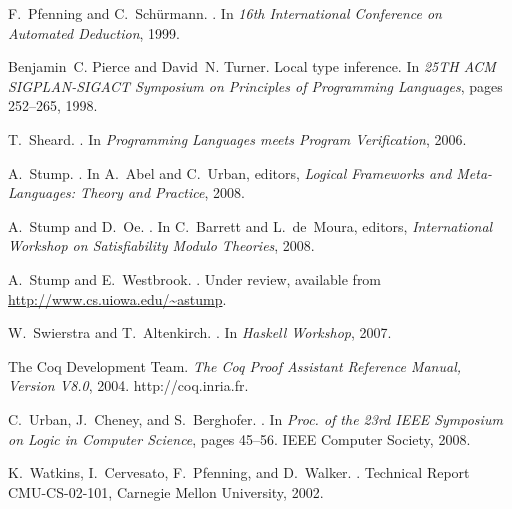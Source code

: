 \documentclass[9pt,natbib]{sigplanconf}
\begin{document}
\begin{thebibliography}{28}
F.~Pfenning and C.~Sch{\"u}rmann.
.
\newblock In \emph{16th International Conference on Automated Deduction}, 1999.

Benjamin~C. Pierce and David~N. Turner.
\newblock Local type inference.
\newblock In \emph{25TH {ACM} {SIGPLAN}-{SIGACT} Symposium on Principles of
  Programming Languages}, pages 252--265, 1998.

T.~Sheard.
.
\newblock In \emph{Programming Languages meets Program Verification}, 2006.

A.~Stump.
.
\newblock In A.~Abel and C.~Urban, editors, \emph{Logical Frameworks and
  Meta-Languages: Theory and Practice}, 2008.

A.~Stump and D.~Oe.
.
\newblock In C.~Barrett and L.~de~Moura, editors, \emph{International Workshop
  on Satisfiability Modulo Theories}, 2008.

A.~Stump and E.~Westbrook.
.
\newblock Under review, available from \url{http://www.cs.uiowa.edu/~astump}.

W.~Swierstra and T.~Altenkirch.
.
\newblock In \emph{Haskell Workshop}, 2007.

{The Coq Development Team}.
\newblock \emph{{The Coq Proof Assistant Reference Manual, Version V8.0}},
  2004.
\newblock http://coq.inria.fr.

C.~Urban, J.~Cheney, and S.~Berghofer.
.
\newblock In \emph{Proc. of the 23rd IEEE Symposium on Logic in Computer
  Science}, pages 45--56. IEEE Computer Society, 2008.

K.~Watkins, I.~Cervesato, F.~Pfenning, and D.~Walker.
.
\newblock Technical Report CMU-CS-02-101, Carnegie Mellon University, 2002.


\end{thebibliography}
\end{document}
